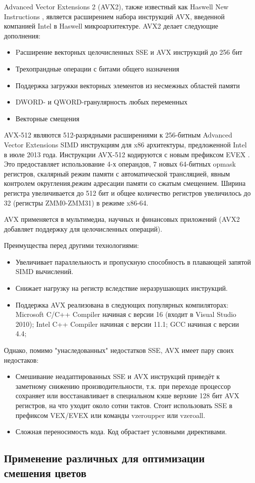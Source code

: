 Advanced Vector Extensions 2 (AVX2), также известный как Haswell New Instructions \cite{bib6},  является расширением набора инструкций AVX, введенной компанией Intel в Haswell микроархитектуре. AVX2 делает следующие дополнения:
\begin{itemize}
\item Pасширение векторных целочисленных SSE и AVX инструкций до 256 бит
\item Трехопрандные операции с битами общего назначения
\item Поддержка загружки векторных элементов из несмежных областей памяти
\item DWORD- и QWORD-гранулярность любых переменных
\item Векторные смещения
\end{itemize}

AVX-512 являются 512-разрядными расширениями к 256-битным Advanced Vector Extensions SIMD инструкциям для x86 архитектуры, предложенной Intel в июле 2013 года. Инструкции AVX-512 кодируются с новым префиксом EVEX . Это предоставляет использование 4-х операндов, 7 новых 64-битных opmask регистров, скалярный режим памяти с автоматической трансляцией, явным контролем округления,режим адресации памяти со сжатым смещением. Ширина регистра увеличивается до 512 бит и общее количество регистров увеличилось до 32 (регистры ZMM0-ZMM31) в режиме x86-64.

AVX применяется в мультимедиа, научных и финансовых приложений (AVX2 добавляет поддержку для целочисленных операций).

Преимущества перед другими технологиями:
\begin{itemize}
\item Увеличивает параллельность и пропускную способность в плавающей запятой SIMD вычислений.
\item Снижает нагрузку на регистр вследствие неразрушающих инструкций.
\item Поддержка AVX реализована в следующих популярных компиляторах:
Microsoft C/C++ Compiler начиная с версии 16 (входит в Visual Studio 2010);
Intel C++ Compiler начиная с версии 11.1;
GCC начиная с версии 4.4;
\end{itemize}

Однако, помимо "унаследованных" недостатков SSE, AVX имеет пару своих недостаков:
\begin{itemize}
	\item Смешивание неадаптированных SSE и AVX инструкций приведёт к заметному снижению производительности, т.к. при переходе процессор сохраняет или восстанавливает в специальном кэше верхние 128 бит AVX регистров, на что уходит около сотни тактов. Стоит использовать SSE в префиксом VEX/EVEX или команды vzeroupper или vzeroall.
	\item Сложная переносимость кода. Код обрастает условными директивами. 
\end{itemize}





\subsection{Применение различных для оптимизации смешения цветов}